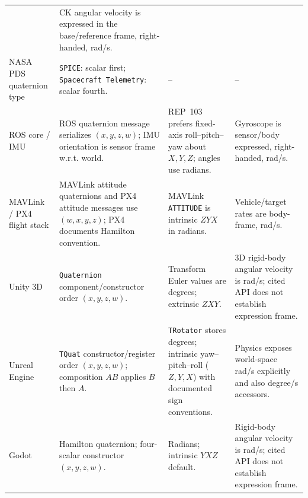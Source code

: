 \documentclass[11pt]{article}
\begin{document}
\begin{longtable}{@{}p{}p{}p{}p{}@{}}
        & CK angular velocity is expressed in the base/reference frame, right-handed, rad/s. \\
        NASA PDS quaternion type
        & \texttt{SPICE}: scalar first; \texttt{Spacecraft Telemetry}: scalar fourth.
        & --
        & -- \\
        ROS core / IMU
        & ROS quaternion message serializes $(x,y,z,w)$; IMU orientation is sensor frame w.r.t. world.
        & REP~103 prefers fixed-axis roll--pitch--yaw about $X,Y,Z$; angles use radians.
        & Gyroscope is sensor/body expressed, right-handed, rad/s. \\
        MAVLink / PX4 flight stack
        & MAVLink attitude quaternions and PX4 attitude messages use $(w,x,y,z)$; PX4 documents Hamilton convention.
        & MAVLink \texttt{ATTITUDE} is intrinsic $ZYX$ in radians.
        & Vehicle/target rates are body-frame, rad/s. \\
        Unity 3D
        & \texttt{Quaternion} component/constructor order $(x,y,z,w)$.
        & Transform Euler values are degrees; extrinsic $ZXY$.
        & 3D rigid-body angular velocity is rad/s; cited API does not establish expression frame. \\
        Unreal Engine
        & \texttt{TQuat} constructor/register order $(x,y,z,w)$; composition $A B$ applies $B$ then $A$.
        & \texttt{TRotator} stores degrees; intrinsic yaw--pitch--roll ($Z,Y,X$) with documented sign conventions.
        & Physics exposes world-space rad/s explicitly and also degree/s accessors. \\
        Godot
        & Hamilton quaternion; four-scalar constructor $(x,y,z,w)$.
        & Radians; intrinsic $YXZ$ default.
        & Rigid-body angular velocity is rad/s; cited API does not establish expression frame. \\
    \end{longtable}
    \endgroup
\end{document}
